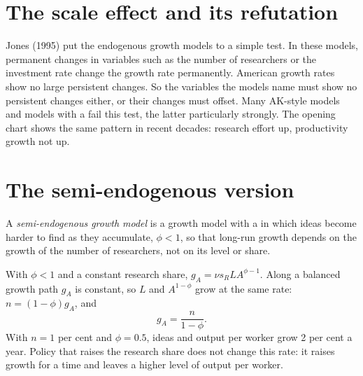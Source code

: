 \section{The scale effect and its refutation}\label{sec:b2:endogenous-growth:scale}

\begin{record}
Jones (1995) put the endogenous growth models to a simple test. In these models, permanent changes in variables such as
the number of researchers or the investment rate change the growth rate permanently. American growth rates show no large
persistent changes. So the variables the models name must show no persistent changes either, or their changes must
offset. Many AK-style models and models with a  fail this test, the latter particularly
strongly. The opening chart shows the same pattern in recent decades: research effort up, productivity
growth not up.
\end{record}

\section{The semi-endogenous version}\label{sec:b2:endogenous-growth:semi}

\begin{definition}\label{def:b2:endogenous-growth:semi-endogenous}
A \emph{semi-endogenous growth model} is a growth model with a  in
which ideas become harder to find as they accumulate, $\phi < 1$, so that long-run growth depends on the growth of the number of
researchers, not on its level or share.
\end{definition}

With $\phi < 1$ and a constant research share, $g_A = \nu s_RLA^{\phi - 1}$. Along a balanced growth path $g_A$ is constant, so $L$ and $A^{1-\phi}$ grow at the same rate: $n = (1 - \phi)g_A$, and
\begin{equation}\label{eq:b2:endogenous-growth:semi}
g_A = \frac{n}{1 - \phi}.
\end{equation}
With $n = 1$ per cent and $\phi = 0.5$, ideas and output per worker grow 2 per cent a year. Policy that raises the research share does not change this rate:
it raises growth for a time and leaves a higher level of output per worker.

